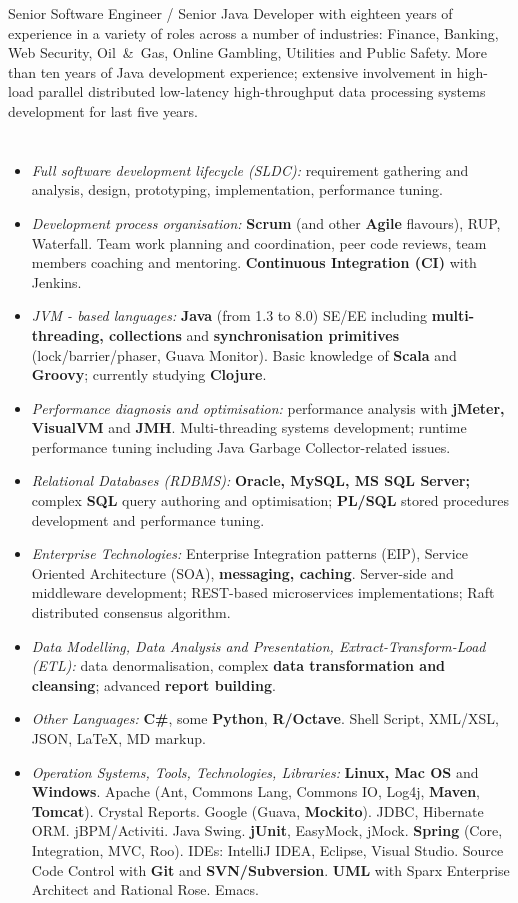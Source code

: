 \documentclass{res}
\newcommand{\emp}[1]{{\bf#1}}
\newcommand{\osection}[1]{\section{\sc {\Large \textbf{#1}\\}} \vspace{0.30cm}}
\newcommand{\profileItem}[2]{\item {\sl #1:} #2.}
\begin{document}
\begin{resume}

\indent Senior Software Engineer / Senior Java Developer with eighteen years of experience in a variety of roles across a number of industries: Finance, Banking, Web Security, Oil~\&~Gas, Online Gambling, Utilities and Public Safety. More than ten years of Java development experience; extensive involvement in high-load parallel distributed low-latency high-throughput data processing systems development for last five years.

\osection{Technical Profile}
\begin{itemize}
  \profileItem {Full software development lifecycle (SLDC)} {requirement gathering and analysis, design, prototyping, implementation, performance tuning}
  \profileItem {Development process organisation} {\emp{Scrum} (and other \emp{Agile} flavours), RUP, Waterfall. Team work planning and coordination, peer code reviews, team members coaching and mentoring. \emp{Continuous Integration (CI)} with Jenkins}
  \profileItem {JVM - based languages} {\emp{Java} (from 1.3 to 8.0) SE/EE including \emp{multi-threading, collections} and \emp{synchronisation primitives} (lock/barrier/phaser, Guava Monitor). Basic knowledge of \emp{Scala} and \emp{Groovy}; currently studying \emp{Clojure}}
  \profileItem{Performance diagnosis and optimisation} {performance analysis with \emp{jMeter, VisualVM} and \emp{JMH}. Multi-threading systems development; runtime performance tuning including Java Garbage Collector-related issues}
  \profileItem {Relational Databases (RDBMS)} {\emp{Oracle, MySQL, MS SQL Server;} complex \emp{SQL} query authoring and optimisation; \emp{PL/SQL} stored procedures development and performance tuning}
  \profileItem{Enterprise Technologies} {Enterprise Integration patterns (EIP), Service Oriented Architecture (SOA), \emp{messaging, caching}. Server-side and middleware development; REST-based microservices implementations; Raft distributed consensus algorithm}
  \profileItem{Data Modelling, Data Analysis and Presentation, Extract-Transform-Load (ETL)} {data denormalisation, complex \emp{data transformation and cleansing}; advanced \emp{report building}}
  \profileItem{Other Languages} {\emp{C\#}, some \emp{Python}, \emp{R/Octave}. Shell Script, XML/XSL, JSON, \LaTeX, MD markup}
  \profileItem{Operation Systems, Tools, Technologies, Libraries} {\emp{Linux, Mac OS} and \emp{Windows}. Apache (Ant, Commons Lang, Commons IO, Log4j, \emp{Maven}, \emp{Tomcat}). Crystal Reports. Google (Guava, \emp{Mockito}). JDBC, Hibernate ORM. jBPM/Activiti. Java Swing. \emp{jUnit}, EasyMock, jMock. \emp{Spring} (Core, Integration, MVC, Roo). IDEs: IntelliJ IDEA, Eclipse, Visual Studio. Source Code Control with \emp{Git} and \emp{SVN/Subversion}. \emp{UML} with Sparx Enterprise Architect and Rational Rose. Emacs}


\end{itemize}
\end{resume}
\end{document}
